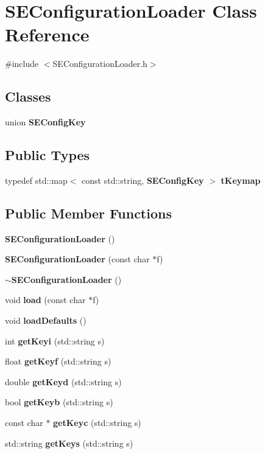 \section{S\+E\+Configuration\+Loader Class Reference}
\label{class_s_e_configuration_loader}


{\ttfamily \#include $<$S\+E\+Configuration\+Loader.\+h$>$}

\subsection*{Classes}
\begin{DoxyCompactItemize}
\item 
union {\bf S\+E\+Config\+Key}
\end{DoxyCompactItemize}
\subsection*{Public Types}
\begin{DoxyCompactItemize}
\item 
typedef std\+::map$<$ const std\+::string, {\bf S\+E\+Config\+Key} $>$ {\bf t\+Keymap}
\end{DoxyCompactItemize}
\subsection*{Public Member Functions}
\begin{DoxyCompactItemize}
\item 
{\bf S\+E\+Configuration\+Loader} ()
\item 
{\bf S\+E\+Configuration\+Loader} (const char $\ast$f)
\item 
{\bf $\sim$\+S\+E\+Configuration\+Loader} ()
\item 
void {\bf load} (const char $\ast$f)
\item 
void {\bf load\+Defaults} ()
\item 
int {\bf get\+Keyi} (std\+::string s)
\item 
float {\bf get\+Keyf} (std\+::string s)
\item 
double {\bf get\+Keyd} (std\+::string s)
\item 
bool {\bf get\+Keyb} (std\+::string s)
\item 
const char $\ast$ {\bf get\+Keyc} (std\+::string s)
\item 
std\+::string {\bf get\+Keys} (std\+::string s)
\end{DoxyCompactItemize}


